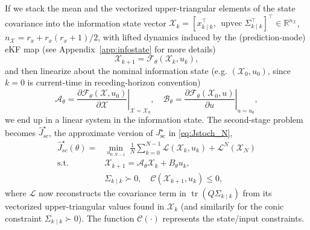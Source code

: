 \documentclass[twocolumn,amsthm]{autart}
\begin{document}
If we stack the mean and the vectorized
upper-triangular elements of the state covariance into the information state vector
$\mathcal X_k = [x_{k\mid k}^\top,\, \operatorname{upvec}\Sigma_{k\mid k}^\top]^\top \in
\mathbb{R}^{n_\mathcal X}$, $n_\mathcal X = r_x + r_x(r_x+1)/2$, with lifted dynamics
induced by the (prediction-mode) eKF map (see Appendix~\ref{app:infostate} for more details)
\begin{equation} \label{eq:eKF as a dynamic system}
\mathcal{X}_{k+1}
     = \mathcal{F}_\theta(\mathcal{X}_k, u_k),
\end{equation}
and then linearize about the nominal information state (e.g. $(\mathcal{X}_0, u_0)$, since $k=0$ is current-time in receding-horizon convention)
\begin{equation*}
    \mathcal A_\theta = \left . \frac{\partial \mathcal F_\theta (\mathcal{X}, u_0)}{ \partial \mathcal{X}} \right |_{\mathcal{X} = \mathcal{X}_0},\quad \mathcal B_\theta = \left . \frac{\partial \mathcal F_\theta (\mathcal{X}_0, u)}{ \partial u} \right |_{u = u_0},
\end{equation*}
we end up in a linear system in the information state. The second-stage problem becomes $\widehat J_{sc} ^\star$, the approximate version of $J_{\mathrm{sc}}^\star$ in \eqref{eq:Jstoch_N},
\begin{equation}\label{eq:mpc}
\begin{aligned}
\widehat J^\star_{sc}(\theta) = &\min_{u_{0:N-1}}\
\frac{1}{N}\sum_{k=0}^{N-1} \mathcal L(\mathcal X_k,u_k) + \mathcal L^N(\mathcal X_N)\\
\text{s.t. } & \mathcal X_{k+1} = \mathcal A_\theta \mathcal X_k +
B_\theta u_k,\\
& \Sigma_{k\mid k} \succ 0,\quad \mathcal C(\mathcal X_{k+1},u_k) \le 0,
\end{aligned}
\end{equation}
where $\mathcal L$ now reconstructs the covariance term in $\operatorname{tr}(Q\Sigma_{k\mid k})$ from its vectorized upper-triangular values found in $\mathcal X_k$ (and similarily for the conic constraint $\Sigma_{k\mid k} \succ 0$). 
The function $\mathcal C(\cdot)$ represents the state/input constraints.
\end{document}
